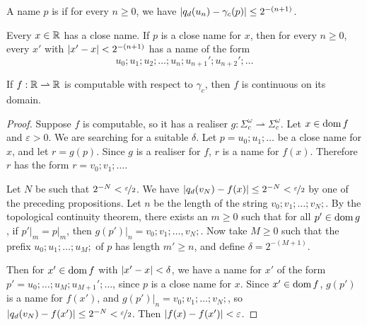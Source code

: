 \begin{definition}
  A name $p$ is  if for every $n \ge 0$, we have $\left| q_d(u_n) -
	\gamma_c(p) \right| \le 2^{-(n+1)}$.
\end{definition}

\begin{lemma}
  Every $x \in \mathbb{R}$ has a close name.
  If $p$ is a close name for $x$, then for every $n \ge 0$, every $x'$ with
  $\left| x'-x \right| < 2^{-(n+1)}$ has a name of the form
  \[
	u_0; u_1; u_2; \ldots; u_n; u_{n+1}'; u_{n+2}'; \ldots
  \]
\end{lemma}

\begin{theorem}
  If $f: \mathbb{R} \rightharpoonup \mathbb{R}$ is computable with respect to $\gamma_c$, then
  $f$ is continuous on its domain.
\end{theorem}

\begin{proof}
  Suppose $f$ is computable, so it has a realiser $g: \Sigma_c^\omega
  \rightharpoonup \Sigma_c^\omega$.
  Let $x \in \operatorname{dom} f$ and $\varepsilon > 0$.
  We are searching for a suitable $\delta$.
  Let $p = u_0; u_1; \ldots$ be a close name for $x$, and let $r = g(p)$.
  Since $g$ is a realiser for $f$, $r$ is a name for $f(x)$.
  Therefore $r$ has the form $r = v_0; v_1; \ldots$.

  Let $N$ be such that $2^{-N} < \nicefrac{\varepsilon}{2}$.
  We have $\left| q_d(v_N) - f(x) \right| \le 2^{-N} < \nicefrac{\varepsilon}{2}$ by one
  of the preceding propositions.
  Let $n$ be the length of the string $v_0; v_1; \ldots; v_N;$.
  By the topological continuity theorem, there exists an $m \ge 0$ such that for
  all $p' \in \operatorname{dom} g$, if $\left. p' \right|_m = \left. p \right|_m$, then
  $\left. g(p') \right|_n = v_0; v_1; \ldots, v_N;$.
  Now take $M \ge 0$ such that the prefix $u_0; u_1; \ldots; u_M;$ of $p$ has
  length $m' \ge n$, and define $\delta = 2^{-(M+1)}$.

  Then for $x' \in \operatorname{dom} f$ with $\left| x' - x \right| < \delta$, we have a name for $x'$
  of the form $p' = u_0; \ldots; u_M; u_{M+1}'; \ldots$, since $p$ is a close
  name for $x$.
  Since $x' \in \operatorname{dom} f$, $g(p')$ is a name for $f(x')$, and $\left. g(p')
  \right|_n = v_0; v_1; \ldots; v_N;$, so $\left| q_d(v_N) - f(x') \right| \le 2^{-N} <
  \nicefrac{\varepsilon}{2}$.
  Then $\left| f(x) - f(x') \right| < \varepsilon$.
\end{proof}


